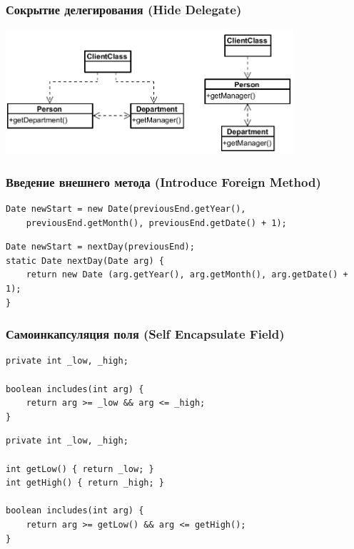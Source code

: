 \documentclass{../../slides-style}
\begin{document}
    \begin{frame}
        \frametitle{Сокрытие делегирования (Hide Delegate)}
        \begin{center}
            \includegraphics[width=0.8\textwidth]{hideDelegate.png}
        \end{center}
    \end{frame}

    \begin{frame}[fragile]
        \frametitle{Введение внешнего метода (Introduce Foreign Method)}
        \begin{verbatim}
Date newStart = new Date(previousEnd.getYear(),
    previousEnd.getMonth(), previousEnd.getDate() + 1);
        \end{verbatim}
        
        \hspace{2cm}{\Huge{$\Downarrow$}}
        
        \begin{verbatim}
Date newStart = nextDay(previousEnd);
static Date nextDay(Date arg) {
    return new Date (arg.getYear(), arg.getMonth(), arg.getDate() + 1);
}
        \end{verbatim}
    \end{frame}

    \begin{frame}[fragile]
        \frametitle{Самоинкапсуляция поля (Self Encapsulate Field)}
        \begin{verbatim}
private int _low, _high;

boolean includes(int arg) {
    return arg >= _low && arg <= _high;
}
        \end{verbatim}
        
        \hspace{2cm}{\Huge{$\Downarrow$}}
        
        \begin{verbatim}
private int _low, _high;

int getLow() { return _low; }
int getHigh() { return _high; }

boolean includes(int arg) {
    return arg >= getLow() && arg <= getHigh();
}
        \end{verbatim}
    \end{frame}
\end{document}
